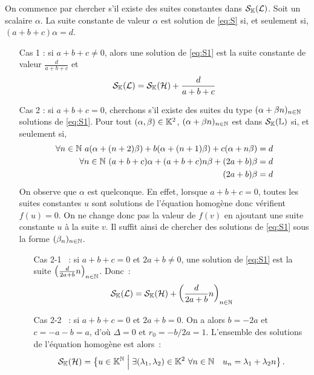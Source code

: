 On commence par chercher s'il existe des suites constantes dans
\(\mathcal{S}_{\mathbb{K}}(\mathcal{L})\). Soit un scalaire \(\alpha\). La suite constante de valeur
\(\alpha\) est solution de \eqref{eq:S} si, et seulement si,
\((a+b+c)\alpha=d\).
\begin{itemize}
  \item[Cas 1] : si \(a+b+c \neq 0\), alors une solution de \eqref{eq:S1} est
    la suite constante de valeur \(\frac{d}{a+b+c}\) et
    \begin{equation}
      \mathcal{S}_{\mathbb{K}}(\mathcal{L}) = \mathcal{S}_{\mathbb{K}}(\mathcal{H}) +\frac{d}{a+b+c}
    \end{equation}
  \item[Cas 2] : si \(a+b+c=0\), cherchons s'il existe des suites du type
    \((\alpha+\beta n)_{n \in \mathbb{N}}\) solutions de \eqref{eq:S1}. Pour tout
    \((\alpha,\beta) \in \mathbb{K}^2\), \((\alpha + \beta n)_{n \in \mathbb{N}}\) est dans
    \(\mathcal{S}_{\mathbb{K}}(\mathbb{L})\) si, et seulement si,
    \begin{align}
      \forall n \in \mathbb{N} \ a(\alpha +(n+2)\beta)+b(\alpha+(n+1)\beta)+c(\alpha
      +n\beta) &=d \\
      \forall n \in \mathbb{N} \ (a+b+c)\alpha +(a+b+c)n\beta +(2a+b)\beta &=d\\
      (2a+b)\beta &=d
    \end{align}
    On observe que \(\alpha\) est quelconque. En effet, lorsque \(a+b+c=0\),
    toutes les suites constantes \(u\) sont solutions de l'équation homogène
    donc vérifient \(f(u)=0\). On ne change donc pas la valeur de \(f(v)\) en
    ajoutant une suite constante \(u\) à la suite \(v\). Il suffit ainsi de
    chercher des solutions de \eqref{eq:S1} sous la forme \((\beta_n)_{n \in
    \mathbb{N}}\).
    \begin{itemize}
      \item[Cas 2-1]~: si \(a+b+c=0\) et \(2a+b \neq 0\), une solution de
        \eqref{eq:S1} est la suite \(\left(\frac{d}{2a+b}n\right)_{n \in
        \mathbb{N}}\). Donc~:
        \begin{equation}
          \mathcal{S}_{\mathbb{K}}(\mathcal{L}) = \mathcal{S}_{\mathbb{K}}(\mathcal{H}) + \left(\frac{d}{2a+b}n\right)_{n \in \mathbb{N}}
        \end{equation}
      \item[Cas 2-2]~: si \(a+b+c=0\) et \(2a+b = 0\). On a alors \(b=-2a\) et
        \(c=-a-b=a\), d'où \(\Delta=0\) et \(r_0=-b/2a=1\). L'ensemble des
        solutions de l'équation homogène est alors~:
        \begin{equation}
          \S_\K(\H) = \enstq{u \in \K^\N}{\exists (\lambda_1, \lambda_2) \in
          \K^2 \ \forall n \in \N \quad u_n = \lambda_1+\lambda_2 n}.

\end{equation}
\end{itemize}
\end{itemize}
